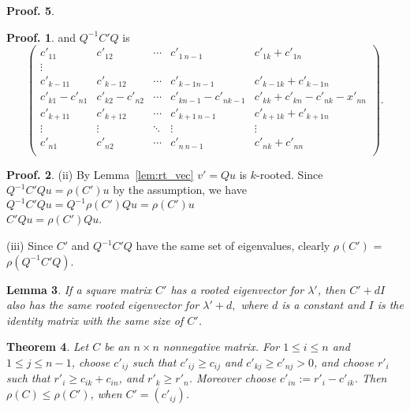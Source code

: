 \documentclass{article}
\theoremstyle{plain}
\newtheorem{thm}{Theorem}[subsection]
\newtheorem{lem}[thm]{Lemma}
\theoremstyle{definition}
\newtheorem{pof}[thm]{Proof.}
\begin{document}
\begin{pof}
    \begin{pof}
        and $Q^{-1}C'Q$ is
        $$\begin{pmatrix}
        c'_{11}     & c'_{12} & \cdots     & c'_{1\ n-1} & c'_{1k}+c'_{1n} \\
        \vdots \\
        c'_{k-11}     & c'_{k-1 2}           & \cdots     & c'_{k-1 n-1} & c'_{k-1k}+c'_{k-1n} \\
        c'_{k1}-c'_{n1} & c'_{k2}-c'_{n2} &\cdots      &c'_{kn-1}-c'_{nk-1}& c'_{kk}+c'_{kn}-c'_{nk}-x'_{nn}\\
        c'_{k+11}     & c'_{k+12}           & \cdots     & c'_{k+1\ n-1} & c'_{k+1k}+c'_{k+1n} \\
        \vdots              & \vdots & \ddots              & \vdots & \vdots \\
        c'_{n1}             & c'_{n2} & \cdots             & c'_{n\ n-1} & c'_{nk}+c'_{nn} \\
        \end{pmatrix}.$$
    \end{pof}

    \begin{pof}
        (ii)
            By Lemma~\ref{lem:rt_vec} $v'=Qu$ is $k$-rooted.  
            Since $Q^{-1}C'Qu=\rho(C')u$ by the assumption, we have
            $Q^{-1} C' Q u  = Q^{-1} \rho(C') Qu  =\rho(C')u$  \\
            $C'Qu=\rho(C')Qu$.

        (iii)
        Since $C'$ and $Q^{-1}C'Q$ have the same set of eigenvalues, clearly $\rho(C')$ = $\rho(Q^{-1}C'Q)$.

    \end{pof}


\begin{lem}\label{l_diag}   %
If a square matrix $C'$ has a rooted eigenvector for $\lambda'$, then $C'+dI$ also has
the same rooted eigenvector for $\lambda'+d,$ where $d$ is a constant and $I$ is the identity matrix with the same size of $C'$.
\end{lem}

\begin{thm}
    Let $C$ be an $n\times n$ nonnegative matrix. For $1\leq i \leq n$ and $1\leq j\leq n-1$, choose $c'_{ij}$
    such that $c'_{ij}\geq c_{ij}$ and $c'_{kj}\geq c'_{nj}>0$, and choose $r'_i$ such that $r'_i\geq c_{ik}+c_{in}$, and
    $r'_k \geq r'_n$. Moreover choose $c'_{in}:=r'_i-c'_{ik}$. Then $\rho(C)\leq \rho(C')$, when $C'=(c'_{ij})$.
\end{thm}


\end{pof}
\end{document}
